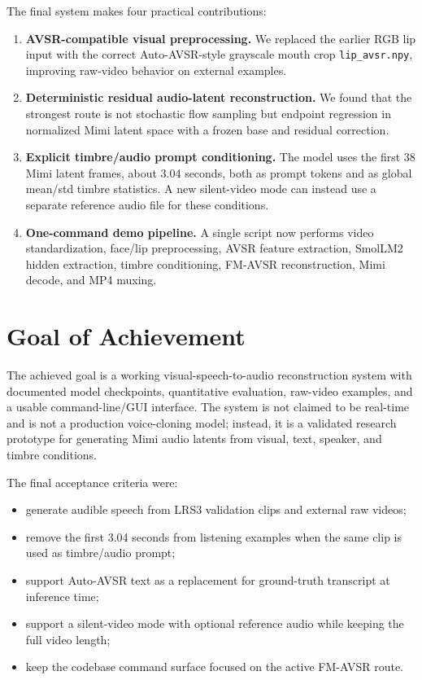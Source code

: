 \documentclass{article}
\begin{document}
The final system makes four practical contributions:
\begin{enumerate}
    \item \textbf{AVSR-compatible visual preprocessing.} We replaced the earlier
    RGB lip input with the correct Auto-AVSR-style grayscale mouth crop
    \texttt{lip\_avsr.npy}, improving raw-video behavior on external examples.
    \item \textbf{Deterministic residual audio-latent reconstruction.} We found
    that the strongest route is not stochastic flow sampling but endpoint
    regression in normalized Mimi latent space with a frozen base and residual
    correction.
    \item \textbf{Explicit timbre/audio prompt conditioning.} The model uses the
    first 38 Mimi latent frames, about 3.04 seconds, both as prompt tokens and as
    global mean/std timbre statistics. A new silent-video mode can instead use a
    separate reference audio file for these conditions.
    \item \textbf{One-command demo pipeline.} A single script now performs video
    standardization, face/lip preprocessing, AVSR feature extraction, SmolLM2
    hidden extraction, timbre conditioning, FM-AVSR reconstruction, Mimi decode,
    and MP4 muxing.
\end{enumerate}

\section{Goal of Achievement}

The achieved goal is a working visual-speech-to-audio reconstruction system with
documented model checkpoints, quantitative evaluation, raw-video examples, and a
usable command-line/GUI interface. The system is not claimed to be real-time and
is not a production voice-cloning model; instead, it is a validated research
prototype for generating Mimi audio latents from visual, text, speaker, and
timbre conditions.

The final acceptance criteria were:
\begin{itemize}
    \item generate audible speech from LRS3 validation clips and external raw
    videos;
    \item remove the first 3.04 seconds from listening examples when the same
    clip is used as timbre/audio prompt;
    \item support Auto-AVSR text as a replacement for ground-truth transcript at
    inference time;
    \item support a silent-video mode with optional reference audio while keeping
    the full video length;
    \item keep the codebase command surface focused on the active FM-AVSR route.
\end{itemize}
\end{document}
